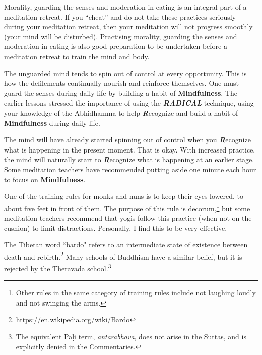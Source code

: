 
Morality, guarding the senses and moderation in eating is an integral part of a meditation retreat. If you “cheat” and do not take these practices seriously during your meditation retreat, then your meditation will not progress smoothly (your mind will be disturbed). Practising morality, guarding the senses and moderation in eating is also good preparation to be undertaken before a meditation retreat to train the mind and body. 


The unguarded mind tends to spin out of control at every opportunity. This is how the defilements continually nourish and reinforce themselves. One must guard the senses during daily life by building a habit of \textbf{Mindfulness}. The earlier lessons stressed the importance of using the \textbf{\textit{RADICAL}} technique, using your knowledge of the Abhidhamma to help \textbf{\textit{R}}ecognize and build a habit of \textbf{Mindfulness} during daily life.

The mind will have already started spinning out of control when you \textbf{\textit{R}}ecognize what is happening in the present moment. That is okay. With increased practice, the mind will naturally start to \textbf{\textit{R}}ecognize what is happening at an earlier stage. Some meditation teachers have recommended putting aside one minute each hour to focus on \textbf{Mindfulness}. 

One of the training rules for monks and nuns is to keep their eyes lowered, to about five feet in front of them. The purpose of this rule is decorum,\footnote{Other rules in the same category of training rules include not laughing loudly and not swinging the arms.} but some meditation teachers recommend that yogis follow this practice (when not on the cushion) to limit distractions. Personally, I find this to be very effective.


The Tibetan word ``bardo" refers to an intermediate state of existence between death and rebirth.\footnote{\url{https://en.wikipedia.org/wiki/Bardo}} Many schools of Buddhism have a similar belief, but it is rejected by the Theravāda school.\footnote{The equivalent Pāḷi term, \textit{antarabhāva}, does not arise in the Suttas, and is explicitly denied in the Commentaries.}

